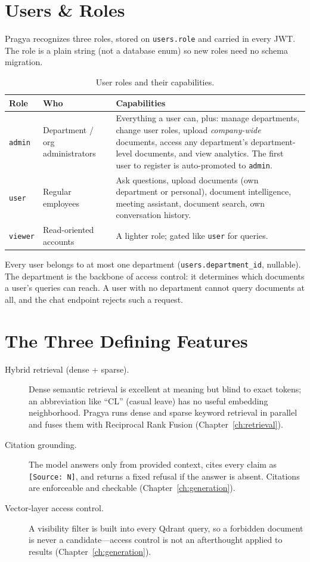 \documentclass[11pt,a4paper,oneside]{report}
\newcommand{\code}[1]{\texttt{#1}}
\begin{document}
\section{Users \& Roles}
Pragya recognizes three roles, stored on \code{users.role} and carried in every JWT. The role is
a plain string (not a database enum) so new roles need no schema migration.

\begin{table}[htbp]
\centering
\caption{User roles and their capabilities.}
\label{tab:roles}
\begin{tabularx}{\linewidth}{|l|L{3.2cm}|X|}
\hline
{}
{\color{white}\textbf{Role}} & {\color{white}\textbf{Who}} & {\color{white}\textbf{Capabilities}}\\
\hline
\code{admin} & Department / org administrators & Everything a user can, plus: manage departments,
change user roles, upload \emph{company-wide} documents, access any department's
department-level documents, and view analytics. The first user to register is auto-promoted to
\code{admin}.\\ \hline
\code{user} & Regular employees & Ask questions, upload documents (own department or personal),
document intelligence, meeting assistant, document search, own conversation history.\\ \hline
\code{viewer} & Read-oriented accounts & A lighter role; gated like \code{user} for queries.\\ \hline
\end{tabularx}
\end{table}

Every user belongs to at most one department (\code{users.department\_id}, nullable). The
department is the backbone of access control: it determines which documents a user's queries
can reach. A user with no department cannot query documents at all, and the chat endpoint
rejects such a request.

\section{The Three Defining Features}
\begin{description}
  \item[Hybrid retrieval (dense + sparse).] Dense semantic retrieval is excellent at meaning
  but blind to exact tokens; an abbreviation like ``CL'' (casual leave) has no useful embedding
  neighborhood. Pragya runs dense and sparse keyword retrieval in parallel and fuses them with
  Reciprocal Rank Fusion (Chapter~\ref{ch:retrieval}).
  \item[Citation grounding.] The model answers only from provided context, cites every claim as
  \code{[Source: N]}, and returns a fixed refusal if the answer is absent. Citations are
  enforceable and checkable (Chapter~\ref{ch:generation}).
  \item[Vector-layer access control.] A visibility filter is built into every Qdrant query, so a
  forbidden document is never a candidate---access control is not an afterthought applied to
  results (Chapter~\ref{ch:generation}).
\end{description}
\end{document}
